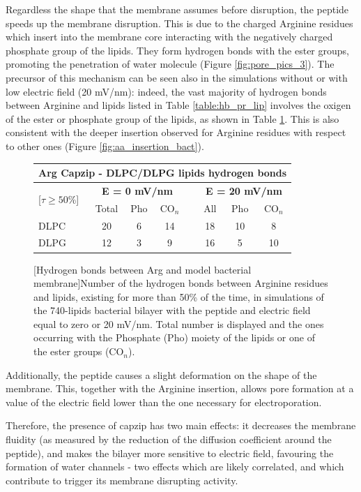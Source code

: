 Regardless the shape that the membrane assumes before disruption, the peptide speeds up the membrane disruption. This is due to the charged Arginine residues which insert into the membrane core interacting with the negatively charged phosphate group of the lipids. They form hydrogen bonds with the ester groups, promoting the penetration of water molecule (Figure \ref{fig:pore_pics_3}).
%
The precursor of this mechanism can be seen also in the simulations without or with low electric field (20 mV/nm): indeed, the vast majority of hydrogen bonds between Arginine and lipids listed in Table \ref{table:hb_pr_lip} involves the oxigen of the ester or phosphate group of the lipids, as shown in Table \ref{table:hb_ester}. This is also consistent with the deeper insertion observed for Arginine residues with respect to other ones (Figure \ref{fig:aa_insertion_bact}).

\begin{figure}[t!]
\centering
 \def\arraystretch{1.6}
\begin{tabular}{lcccccccc}
\multicolumn{9}{c}{\textbf{Arg Capzip - DLPC/DLPG lipids hydrogen bonds}} \\
\hline
\multicolumn{2}{l}{\multirow{2}{*}{[$\tau \ge 50$\%]}} & \multicolumn{3}{c}{\textbf{E = 0 mV/nm}} && \multicolumn{3}{c}{\textbf{E = 20 mV/nm}} \\
\cline{3-9}
&& Total & Pho & CO$_n$ && All & Pho & CO$_n$ \\ 
\hline
DLPC && 20 & 6 & 14 && 18 & 10 & 8 \\
DLPG && 12 & 3 & 9 && 16 & 5 & 10 \\
\hline
 \end{tabular}
[Hydrogen bonds between Arg and model bacterial membrane]{Number of the hydrogen bonds between Arginine residues and lipids, existing for more than 50\% of the time, in simulations of the 740-lipids bacterial bilayer with the peptide and electric field equal to zero or 20 mV/nm. Total number is displayed and the ones occurring with the Phosphate (Pho) moiety of the lipids or one of the ester groups (CO$_n$).}
\label{table:hb_ester}
\end{figure}

Additionally, the peptide causes a slight deformation on the shape of the membrane. This, together with the Arginine insertion, allows pore formation at a value of the electric field lower than the one necessary for electroporation.

Therefore, the presence of capzip has two main effects: it decreases the membrane fluidity (as measured by the reduction of the diffusion coefficient around the peptide), and makes the bilayer more sensitive to electric field, favouring the formation of water channels - two effects which are likely correlated, and which contribute to trigger its membrane disrupting activity.


